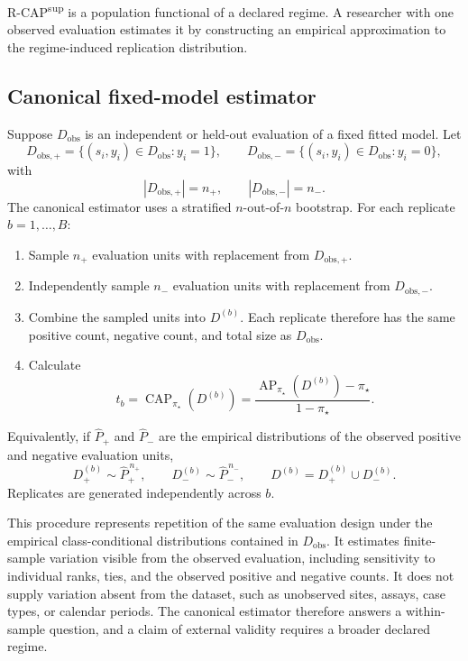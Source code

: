 \documentclass[11pt]{article}
\newcommand{\AP}{\operatorname{AP}}
\newcommand{\CAP}{\operatorname{CAP}}
\newcommand{\Tpi}{\CAP_{\pi_\star}}
\theoremstyle{remark}
\begin{document}
R-CAP\textsuperscript{sup} is a population functional of a declared regime. A researcher with one observed evaluation estimates it by constructing an empirical approximation to the regime-induced replication distribution.

\subsection{Canonical fixed-model estimator}

Suppose $D_{\mathrm{obs}}$ is an independent or held-out evaluation of a fixed fitted model. Let
\[
D_{\mathrm{obs},+}
=
\{(s_i,y_i)\in D_{\mathrm{obs}}:y_i=1\},
\qquad
D_{\mathrm{obs},-}
=
\{(s_i,y_i)\in D_{\mathrm{obs}}:y_i=0\},
\]
with
\[
|D_{\mathrm{obs},+}|=n_+,
\qquad
|D_{\mathrm{obs},-}|=n_-.
\]
The canonical estimator uses a stratified $n$-out-of-$n$ bootstrap. For each replicate $b=1,\ldots,B$:
\begin{enumerate}
\item Sample $n_+$ evaluation units with replacement from $D_{\mathrm{obs},+}$.
\item Independently sample $n_-$ evaluation units with replacement from $D_{\mathrm{obs},-}$.
\item Combine the sampled units into $D^{(b)}$. Each replicate therefore has the same positive count, negative count, and total size as $D_{\mathrm{obs}}$.
\item Calculate
\[
t_b=\Tpi(D^{(b)})
=
\frac{\AP_{\pi_\star}(D^{(b)})-\pi_\star}{1-\pi_\star}.
\]
\end{enumerate}

Equivalently, if $\widehat P_+$ and $\widehat P_-$ are the empirical distributions of the observed positive and negative evaluation units,
\[
D_+^{(b)}\sim \widehat P_+^{\,n_+},
\qquad
D_-^{(b)}\sim \widehat P_-^{\,n_-},
\qquad
D^{(b)}=D_+^{(b)}\cup D_-^{(b)}.
\]
Replicates are generated independently across $b$.

This procedure represents repetition of the same evaluation design under the empirical class-conditional distributions contained in $D_{\mathrm{obs}}$. It estimates finite-sample variation visible from the observed evaluation, including sensitivity to individual ranks, ties, and the observed positive and negative counts. It does not supply variation absent from the dataset, such as unobserved sites, assays, case types, or calendar periods. The canonical estimator therefore answers a within-sample question, and a claim of external validity requires a broader declared regime.
\end{document}
